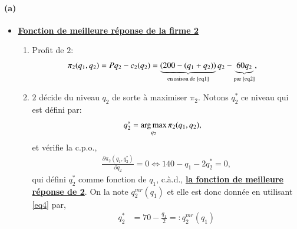 \begin{frame}[allowframebreaks]{\insertsection}
\framesubtitle{(a)}

    \begin{itemize}
        \item \underline{\textbf{Fonction de meilleure réponse de la firme 2}}
        \begin{enumerate}[$\cdot$]
        \item Profit de $2$: 
        \begin{align}
            \pi_2(q_1, q_2) &= Pq_2 - c_2(q_2) = \underbrace{\left(200-(q_1+q_2)\right)}_{\text{en raison de \eqref{eq1}}}q_2 - 
            \underbrace{60q_2}_{\text{par \eqref{eq2}}},
            \label{eq3}
        \end{align}
        \item $2$ décide du niveau $q_2$ de sorte à maximiser $\pi_2$. Notons $q_2^*$ ce niveau qui est défini par:
        \begin{align*}
            q^*_2 &= \argmax_{q_2} \pi_2(q_1, q_2) ,
        \end{align*}
         et vérifie la c.p.o.,
         \begin{align}
             \frac{\partial \pi_2(q_1, q_2^*)}{\partial q_2} = 0 \Leftrightarrow 140-q_1-2q^*_2 = 0,
             \label{eq4}
         \end{align}
        qui défini $q^*_2$ comme fonction de $q_1$, c.à.d., \textbf{\underline{la fonction de meilleure réponse de 2}}. 
        On la note $q^{mr}_2(q_1)$ et elle est donc donnée en utilisant \eqref{eq4} par,
        \begin{align}
            q^*_2 & = 70 - \frac{q_1}{2}=: q^{mr}_2(q_1)
           \label{eq5}
        \end{align}
        \end{enumerate}
    \end{itemize}
\end{frame}

